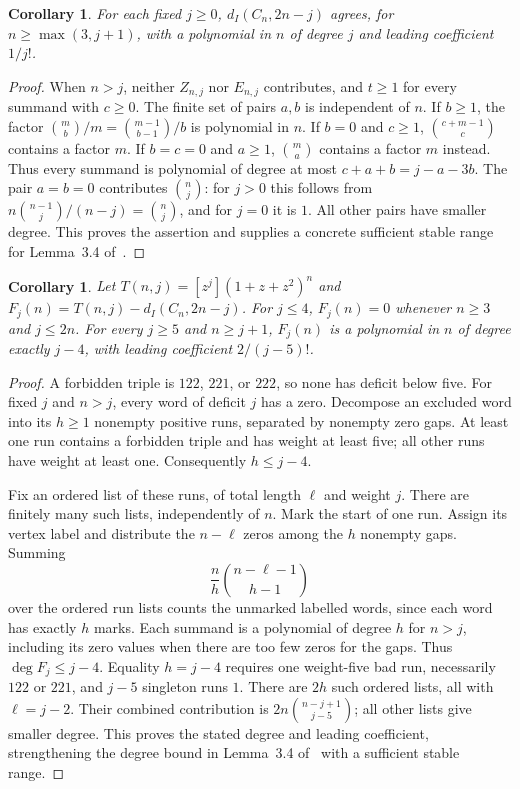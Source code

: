 \documentclass[11pt]{article}
\newtheorem{corollary}[theorem]{Corollary}
\newcommand{\di}{d_I}
\begin{document}
\begin{corollary}\label{cor:poly}
For each fixed $j\geq0$, $\di(C_n,2n-j)$ agrees, for
$n\geq\max(3,j+1)$, with a polynomial in $n$ of degree $j$ and leading
coefficient $1/j!$.
\end{corollary}
\begin{proof}
When $n>j$, neither $Z_{n,j}$ nor $E_{n,j}$ contributes, and $t\geq1$
for every summand with $c\geq0$. The finite set of pairs $a,b$ is
independent of $n$. If $b\geq1$, the factor
$\binom mb/m=\binom{m-1}{b-1}/b$ is polynomial in $n$.
If $b=0$ and $c\geq1$, $\binom{c+m-1}{c}$ contains a factor $m$.
If $b=c=0$ and $a\geq1$, $\binom ma$ contains a factor $m$ instead.
Thus every summand is polynomial of degree at most
$c+a+b=j-a-3b$. The pair $a=b=0$ contributes $\binom nj$:
for $j>0$ this follows from
$n\binom{n-1}{j}/(n-j)=\binom nj$, and for $j=0$ it is $1$.
All other pairs have smaller degree. This proves the assertion and
supplies a concrete sufficient stable range for Lemma~3.4 of~\cite{SZ}.
\end{proof}

\begin{corollary}\label{cor:excluded}
Let $T(n,j)=[z^j](1+z+z^2)^n$ and
$F_j(n)=T(n,j)-\di(C_n,2n-j)$.
For $j\leq4$, $F_j(n)=0$ whenever $n\geq3$ and $j\leq2n$.
For every $j\geq5$ and $n\geq j+1$, $F_j(n)$ is a polynomial in $n$
of degree exactly $j-4$, with leading coefficient $2/(j-5)!$.
\end{corollary}
\begin{proof}
A forbidden triple is $122$, $221$, or $222$, so none has deficit below
five. For fixed $j$ and $n>j$, every word of deficit $j$ has a zero.
Decompose an excluded word into its $h\geq1$ nonempty positive runs,
separated by nonempty zero gaps. At least one run contains a forbidden
triple and has weight at least five; all other runs have weight at least
one. Consequently $h\leq j-4$.

Fix an ordered list of these runs, of total length $\ell$ and weight $j$.
There are finitely many such lists, independently of $n$.
Mark the start of one run. Assign its vertex label and distribute
the $n-\ell$ zeros among the $h$ nonempty gaps. Summing
\[
 \frac nh\binom{n-\ell-1}{h-1}
\]
over the ordered run lists counts the unmarked labelled words, since
each word has exactly $h$ marks. Each summand is a polynomial of
degree $h$ for $n>j$, including its zero values when there are too few
zeros for the gaps. Thus $\deg F_j\leq j-4$.
Equality $h=j-4$ requires one weight-five bad run, necessarily $122$ or
$221$, and $j-5$ singleton runs $1$. There are $2h$ such ordered lists,
all with $\ell=j-2$. Their combined contribution is
$2n\binom{n-j+1}{j-5}$; all other lists give smaller degree.
This proves the stated degree and leading coefficient, strengthening
the degree bound in Lemma~3.4 of~\cite{SZ} with a sufficient stable range.
\end{proof}
\end{document}
